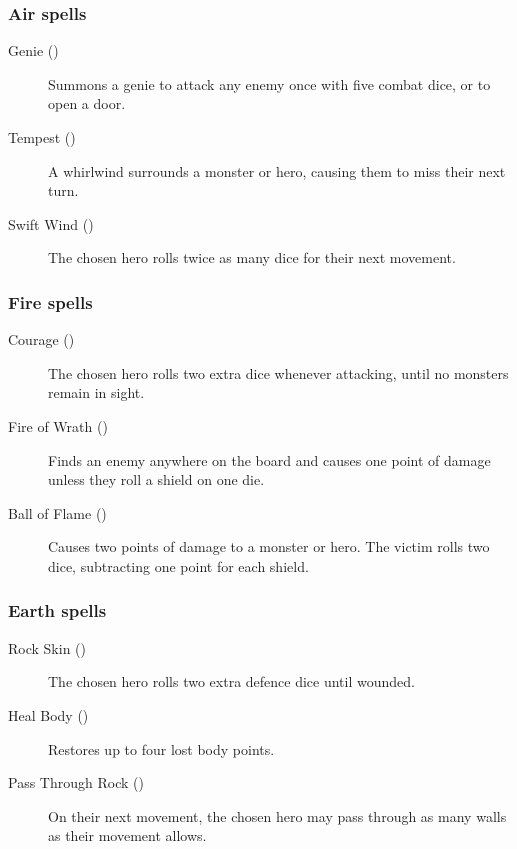 \subsubsection*{Air spells}
\begin{description}
\item[Genie ()] Summons a genie to attack any enemy once with five combat dice, or to open a door.
\item[Tempest ()] A whirlwind surrounds a monster or hero, causing them to miss their next turn.
\item[Swift Wind ()] The chosen hero rolls twice as many dice for their next movement.
\end{description}
\subsubsection*{Fire spells}
\begin{description}
\item[Courage ()] The chosen hero rolls two extra dice whenever attacking, until no monsters remain in sight.
\item[Fire of Wrath ()] Finds an enemy anywhere on the board and causes one point of damage unless they roll a shield on one die.
\item[Ball of Flame ()] Causes two points of damage to a monster or hero. The victim rolls two dice, subtracting one point for each shield.
\end{description}
\subsubsection*{Earth spells}
\begin{description}
\item[Rock Skin ()] The chosen hero rolls two extra defence dice until wounded.
\item[Heal Body ()] Restores up to four lost body points.
\item[Pass Through Rock ()] On their next movement, the chosen hero may pass through as many walls as their movement allows.
\end{description}
